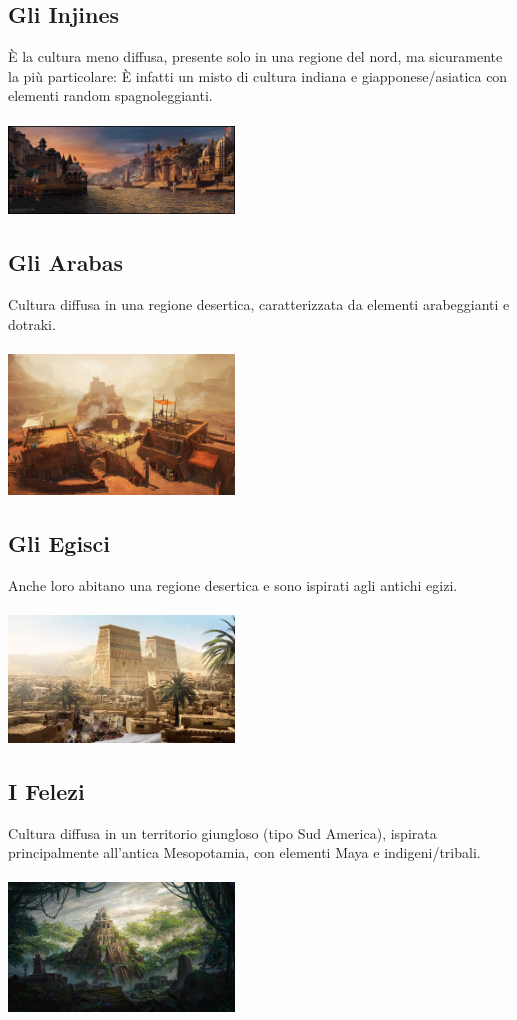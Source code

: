 \documentclass[10pt, a4paper]{report}
\begin{document}
\begin{multicols}{2}
\subsection*{Gli Injines}
È la cultura meno diffusa, presente solo in una regione del nord, ma sicuramente la più particolare: È infatti un misto di cultura indiana e giapponese/asiatica con elementi random spagnoleggianti.\\
\\
\includegraphics[width=6cm]{injines.jpg}

\subsection*{Gli Arabas}
Cultura diffusa in una regione desertica, caratterizzata da elementi arabeggianti e dotraki.\\
\\
\includegraphics[width=6cm]{arabas.jpg}

\subsection*{Gli Egisci}
Anche loro abitano una regione desertica e sono ispirati agli antichi egizi.\\
\\
\includegraphics[width=6cm]{egisci.jpg}

\subsection*{I Felezi}
Cultura diffusa in un territorio giungloso (tipo Sud America), ispirata principalmente all'antica Mesopotamia, con elementi Maya e indigeni/tribali. \\
\\
\includegraphics[width=6cm]{felezi.jpg} 


\end{multicols}
\end{document}
